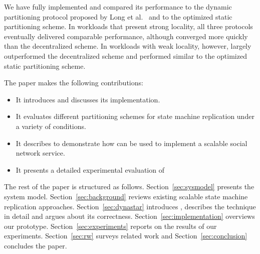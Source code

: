 {We have fully implemented \dynastar and compared its performance to
the dynamic partitioning protocol proposed by Long et
al.~\cite{hoang2016} and to the optimized static partitioning scheme.
In workloads that present strong
locality, all three protocols eventually delivered comparable
performance, although \dynastar converged more quickly than the
decentralized scheme.  In workloads with weak locality, however,
\dynastar largely outperformed the decentralized scheme and performed
similar to the optimized static partitioning scheme.


The paper makes the following contributions:
\begin{itemize}
\item It introduces \dynastar and discusses its implementation. 
\item It evaluates different partitioning schemes for state machine replication under a variety of conditions.
\item It describes \appname{} to demonstrate how \libname{} can be used to implement a scalable social network service.
\item It presents a detailed experimental evaluation of \dynastar
\end{itemize}

The rest of the paper is structured as follows.
Section~\ref{sec:sysmodel} presents the system model.
Section~\ref{sec:background} reviews existing scalable state machine replication approaches.
Section~\ref{sec:dynastar} introduces \dynastar, describes the technique in detail and argues about its correctness.
Section~\ref{sec:implementation} overviews our prototype.
Section~\ref{sec:experiments} reports on the results of our experiments.
Section~\ref{sec:rw} surveys related work and
Section~\ref{sec:conclusion} concludes the paper.




}
